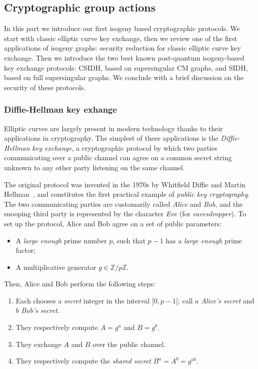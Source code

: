 \documentclass[10pt]{article}
\theoremstyle{plain}
\theoremstyle{definition}
\begin{document}
\begin{prposition}
\clearpage
\part{Cryptographic group actions}

In this part we introduce our first isogeny based cryptographic
protocols. %
We start with classic elliptic curve key exchange, then we review one
of the first applications of isogeny graphs: security reduction for
classic elliptic curve key exchange. %
Then we introduce the two best known post-quantum isogeny-based key
exchange protocols: CSIDH, based on supersingular CM graphs, and SIDH,
based on full supersingular graphs. %
We conclude with a brief discussion on the security of these protocols.


\section{Diffie-Hellman key exhange}
\label{sec:appl-diff-hellm}

Elliptic curves are largely present in modern technology thanks to
their applications in cryptography. %
The simplest of these applications is the \emph{Diffie-Hellman key
  exchange}, a cryptographic protocol by which two parties
communicating over a public channel can agree on a common secret
string unknown to any other party listening on the same channel.

The original protocol was invented in the 1970s by Whitfield Diffie
and Martin Hellman~\cite{DifHel76}, and constitutes the first practical
example of \emph{public key cryptography}. %
The two communicating parties are customarily called \emph{Alice} and
\emph{Bob}, and the snooping third party is represented by the
character \emph{Eve} (for \emph{eavesdropper}). %
To set up the protocol, Alice and Bob agree on a set of public
parameters:
\begin{itemize}
\item A \emph{large enough} prime number $p$, such that $p-1$ has a
  \emph{large enough} prime factor;
\item A multiplicative generator $g∈ℤ/pℤ$.
\end{itemize}

Then, Alice and Bob perform the following steps:
\begin{enumerate}
\item Each chooses a \emph{secret} integer in the interval $]0,p-1[$;
  call $a$ \emph{Alice's secret} and $b$ \emph{Bob's secret}.
\item They respectively compute $A=g^a$ and $B=g^b$.
\item They exchange $A$ and $B$ over the public channel.
\item They respectively compute the \emph{shared secret}
  $B^a=A^b=g^{ab}$.
\end{enumerate}


\end{prposition}
\end{document}
